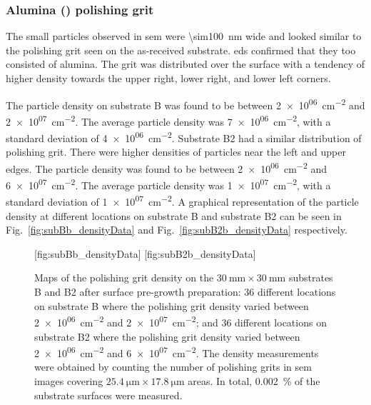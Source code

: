 \subsubsection{Alumina () polishing grit}

The small particles observed in \ac{sem} were \SI{\sim100}{\nano\metre} wide and looked similar to the polishing grit seen on the as-received substrate. \Ac{eds} confirmed that they too consisted of alumina. The grit was distributed over the surface with a tendency of higher density towards the upper right, lower right, and lower left corners. 

The particle density on substrate B was found to be between \SI{2e+06}{\centi\metre^{-2}} and \SI{2e+07}{\centi\metre^{-2}}. The average particle density was \SI{7e+06}{\centi\metre^{-2}}, with a standard deviation of \SI{4e+06}{\centi\metre^{-2}}. Substrate B2 had a similar distribution of polishing grit. There were higher densities of particles near the left and upper edges. The particle density was found to be between \SI{2e+06}{\centi\metre^{-2}} and \SI{6e+07}{\centi\metre^{-2}}. The average particle density was \SI{1e+07}{\centi\metre^{-2}}, with a standard deviation of \SI{1e+07}{\centi\metre^{-2}}. A graphical representation of the particle density at different locations on substrate B and substrate B2 can be seen in Fig.~\ref{fig:subBb_densityData} and Fig.~\ref{fig:subB2b_densityData} respectively.

\begin{figure}[htbp]
    \centering
    [fig:subBb_densityData]
    \hfill
    [fig:subB2b_densityData]
    \caption[Maps of the polishing grit density on substrates B and B2 after surface pre-growth preparation.]{Maps of the polishing grit density on the $\SI{30}{\milli\metre}\times\SI{30}{\milli\metre}$ substrates B and B2 after surface pre-growth preparation:  36 different locations on substrate B where the polishing grit density varied between \SI{2e+06}{\centi\metre^{-2}} and \SI{2e+07}{\centi\metre^{-2}}; and  36 different locations on substrate B2 where the polishing grit density varied between \SI{2e+06}{\centi\metre^{-2}} and \SI{6e+07}{\centi\metre^{-2}}. The density measurements were obtained by counting the number of polishing grits in \ac{sem} images covering $\SI{25.4}{\micro\metre}\times\SI{17.8}{\micro\metre}$ areas. In total, \SI{0.002}{\percent} of the substrate surfaces were measured.}
    \label{fig:subBb_and_subB2b_densityData}
\end{figure}

